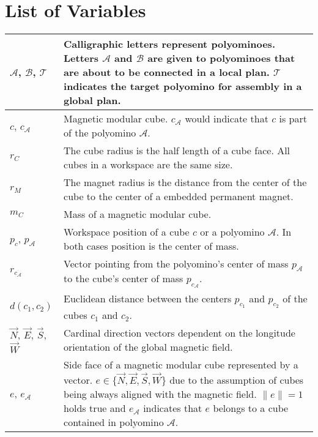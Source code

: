 \chapter*{List of Variables}

\begin{xltabular}{\textwidth}{ l  X }
	\toprule
	
	$\mathcal{A}$, $\mathcal{B}$, $\mathcal{T}$
	&
	Calligraphic letters represent polyominoes.
	Letters $\mathcal{A}$ and $\mathcal{B}$ are given to polyominoes that are about to be connected in a local plan.
	$\mathcal{T}$ indicates the target polyomino for assembly in a global plan.
	\\ \midrule
	
	$c$, $c_\mathcal{A}$
	&
	Magnetic modular cube. $c_\mathcal{A}$ would indicate that $c$ is part of the polyomino $\mathcal{A}$.
	\\ \midrule
	
	$r_C$
	&
	The cube radius is the half length of a cube face.
	All cubes in a workspace are the same size.
	\\ \midrule
	
	$r_M$
	&
	The magnet radius is the distance from the center of the cube to the center of a embedded permanent magnet.
	\\ \midrule
	
	$m_C$
	&
	Mass of a magnetic modular cube.
	\\ \midrule
	
	$p_c$, $p_\mathcal{A}$ 
	&
	Workspace position of a cube $c$ or a polyomino $\mathcal{A}$.
	In both cases position is the center of mass.
	\\ \midrule
	
	$r_{c_\mathcal{A}}$  
	&
	Vector pointing from the polyomino's center of mass $p_\mathcal{A}$ to the cube's center of mass $p_{c_\mathcal{A}}$. 
	\\ \midrule
	
	$d(c_1, c_2)$  
	&
	Euclidean distance between the centers $p_{c_1}$ and $p_{c_2}$ of the cubes $c_1$ and $c_2$.
	\\ \midrule
	
	$\vec{N}$, $\vec{E}$, $\vec{S}$, $\vec{W}$
	&
	Cardinal direction vectors dependent on the longitude orientation of the global magnetic field.
	\\ \midrule
	
	$e$, $e_\mathcal{A}$
	&
	Side face of a magnetic modular cube represented by a vector.
	$e \in \{ \vec{N},\vec{E},\vec{S},\vec{W}\}$ due to the assumption of cubes being always aligned with the magnetic field. 
	$\lVert e \rVert = 1$ holds true and $e_\mathcal{A}$ indicates that $e$ belongs to a cube contained in polyomino $\mathcal{A}$.
	\\ \midrule
	

\end{xltabular}
